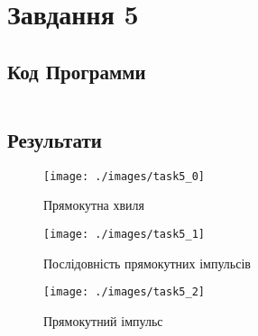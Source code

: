 \section{Завдання 5}
\label{sec:task5}

\subsection{Код Программи}
\label{subsec:task5_code}
\inputminted{python}{../src/task5.py}

\subsection{Результати}
\label{subsec:task5_results}

\begin{figure}[!ht]
    \centering
    \texttt{[image: ./images/task5\_0]}
    \caption{Прямокутна хвиля}
    \label{fig:square_wave_infinite}
\end{figure}

\begin{figure}[!ht]
    \centering
    \texttt{[image: ./images/task5\_1]}
    \caption{Послідовність прямокутних імпульсів}
    \label{fig:square_wave_buffer}
\end{figure}

\begin{figure}[!ht]
    \centering
    \texttt{[image: ./images/task5\_2]}
    \caption{Прямокутний імпульс}
    \label{fig:square_pulse}
\end{figure}
